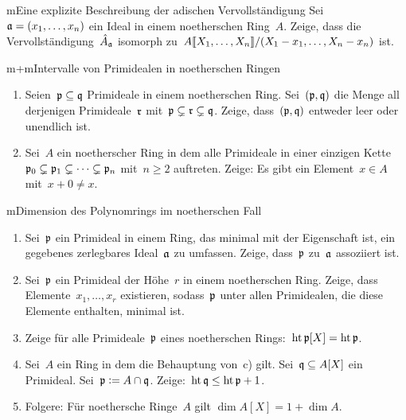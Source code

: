 \documentclass{uebblatt}
\begin{document}
\enlargethispage{2em}

\begin{aufgabe}{m}{Eine explizite Beschreibung der adischen Vervollständigung}
Sei~$\mathfrak{a} = (x_1,\ldots,x_n)$ ein Ideal in einem noetherschen Ring~$A$. Zeige,
dass die Vervollständigung~$\hat A_{\mathfrak{a}}$ isomorph
zu~${A}\llbracket{X_1,\ldots,X_n}\rrbracket/(X_1-x_1,\ldots,X_n-x_n)$ ist.
\end{aufgabe}

\begin{aufgabe}{m+m}{Intervalle von Primidealen in noetherschen Ringen}
\begin{enumerate}
\item
Seien~$\mathfrak{p} \subseteq \mathfrak{q}$ Primideale in einem
noetherschen Ring. Sei~$(\mathfrak{p},\mathfrak{q})$ die Menge all derjenigen Primideale~$\mathfrak{r}$
mit~$\mathfrak{p} \subsetneq \mathfrak{r} \subsetneq \mathfrak{q}$. Zeige, dass~$(\mathfrak{p},\mathfrak{q})$ entweder
leer oder unendlich ist.
\item Sei~$A$ ein noetherscher Ring in dem alle Primideale in einer einzigen Kette~$\mathfrak{p}_0
\subsetneq \mathfrak{p}_1 \subsetneq \cdots \subsetneq \mathfrak{p}_n$ mit~$n \geq 2$ auftreten.
Zeige: Es gibt ein Element~$x \in A$ mit~$x + 0 \neq x$.
\end{enumerate}
\end{aufgabe}

\begin{aufgabe}{m}{Dimension des Polynomrings im noetherschen Fall}
\begin{enumerate}
\item Sei~$\mathfrak{p}$ ein Primideal in einem Ring, das minimal mit der Eigenschaft
ist, ein gegebenes zerlegbares Ideal~$\mathfrak{a}$ zu umfassen. Zeige, dass~$\mathfrak{p}$
zu~$\mathfrak{a}$ assoziiert ist.
\item Sei~$\mathfrak{p}$ ein Primideal der Höhe~$r$ in einem noetherschen Ring.
Zeige, dass Elemente~$x_1,\ldots,x_r$ existieren, sodass~$\mathfrak{p}$ unter allen
Primidealen, die diese Elemente enthalten, minimal ist.
\item Zeige für alle Primideale~$\mathfrak{p}$ eines noetherschen Rings:~$\operatorname{ht}
\mathfrak{p}[X] = \operatorname{ht} \mathfrak{p}$.
\item Sei~$A$ ein Ring in dem die Behauptung von~c) gilt.
Sei~$\mathfrak{q} \subseteq A[X]$ ein Primideal. Sei~$\mathfrak{p} \vcentcolon= A \cap \mathfrak{q}$.
Zeige:~$\operatorname{ht} \mathfrak{q} \leq \operatorname{ht} \mathfrak{p} + 1$.
\item Folgere: Für noethersche Ringe~$A$ gilt $\dim A[X] = 1 + \dim A$.
\end{enumerate}
\end{aufgabe}
\end{document}
